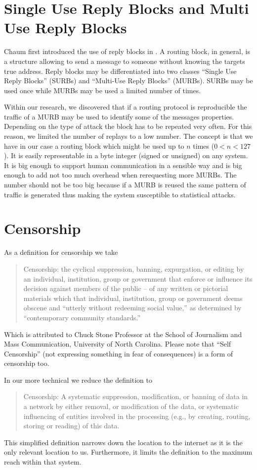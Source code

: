 \section{Single Use Reply Blocks and Multi Use Reply Blocks}
Chaum first introduced the use of reply blocks in \cite{CHAUM1}. A routing block, in general, is a structure allowing to send a message to someone without knowing the targets true address. Reply blocks may be differentiated into two classes ``Single Use Reply Blocks'' (SURBs)  and ``Multi-Use Reply Blocks'' (MURBs). SURBs may be used once while MURBs may be used a limited number of times. 

Within our research, we discovered that if a routing protocol is reproducible the traffic of a MURB may be used to identify some of the messages properties. Depending on the type of attack the block has to be repeated very often. For this reason, we limited the number of replays to a low number. The concept is that we have in our case a routing block which might be used up to $n$ times ($0<n<127$). It is easily representable in a byte integer (signed or unsigned) on any system. It is big enough to support human communication in a sensible way and is big enough to add not too much overhead when rerequesting more MURBs. The number should not be too big because if a MURB is reused the same pattern of traffic is generated thus making the system susceptible to statistical attacks.

\section{Censorship}
As a definition for censorship we take
\begin{quote}
	Censorship: the cyclical suppression, banning, expurgation, or editing by an individual, institution, group or government that enforce or influence its decision against members of the public -- of any written or pictorial materials which that individual, institution, group or government deems obscene and ``utterly without redeeming social value,'' as determined by ``contemporary community standards.''
\end{quote}

Which is attributed to Chuck Stone Professor at the School of Journalism and Mass Communication, University of North Carolina. Please note that ``Self Censorship'' (not expressing something in fear of consequences) is a form of censorship too.

In our more technical we reduce the definition to
\begin{quote}
	Censorship: A systematic suppression, modification, or banning of data in a network by either removal, or modification of the data, or systematic influencing of entities involved in the processing (e.g., by creating, routing, storing or reading) of this data.
\end{quote}
This simplified definition narrows down the location to the internet as it is the only relevant location to us.  Furthermore, it limits the definition to the maximum reach within that system.

